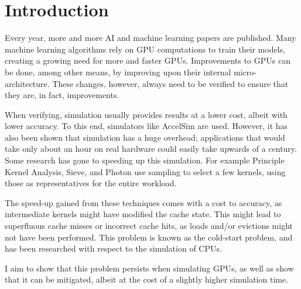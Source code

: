 \chapter{Introduction}\label{ch:introduction}

Every year, more and more AI and machine learning papers are published\cite{aiindex}.
Many machine learning algorithms rely on GPU computations to train their models, creating a growing need for more and faster GPUs.
Improvements to GPUs can be done, among other means, by improving upon their internal micro-architecture.
These changes, however, always need to be verified to ensure that they are, in fact, improvements.

When verifying, simulation usually provides results at a lower cost, albeit with lower accuracy.
To this end, simulators like AccelSim\cite{accelsim} are used.
However, it has also been shown that simulation has a huge overhead; applications that would take only about an hour on real hardware could easily take upwards of a century\cite{pks}.
Some research has gone to speeding up this simulation.
For example Principle Kernel Analysis\cite{pks}, Sieve\cite{sieve}, and Photon\cite{photon} use sampling to select a few kernels, using those as representatives for the entire workload.

The speed-up gained from these techniques comes with a cost to accuracy, as intermediate kernels might have modified the cache state.
This might lead to superfluous cache misses or incorrect cache hits, as loads and/or evictions might not have been performed.
This problem is known as the cold-start problem, and has been researched with respect to the simulation of CPUs. %

I aim to show that this problem persists when simulating GPUs, as well as show that it can be mitigated, albeit at the cost of a slightly higher simulation time.